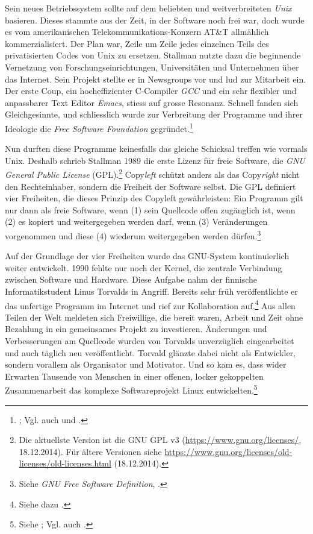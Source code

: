 \documentclass[
paper=164mm:234mm, %
pagesize, %
DIV=calc, %
10pt, %
BCOR=0mm, %
parskip=half- %
]{scrbook}
\begin{document}
Sein neues Betriebssystem sollte auf dem beliebten und weitverbreiteten \emph{Unix} basieren. Dieses stammte aus der Zeit, in der Software noch frei war, doch wurde es vom amerikanischen Telekommunikations-Konzern AT\&T allmählich kommerzialisiert. Der Plan war, Zeile um Zeile jedes einzelnen Teils des privatisierten Codes von Unix zu ersetzen. Stallman nutzte dazu die beginnende Vernetzung von Forschungseinrichtungen, Universitäten und Unternehmen über das Internet. Sein Projekt stellte er in Newsgroups vor und lud zur Mitarbeit ein. Der erste Coup, ein hocheffizienter C-Compiler \emph{GCC} und ein sehr flexibler und anpassbarer Text Editor \emph{Emacs}, stiess auf grosse Resonanz. Schnell fanden sich Gleichgesinnte, und schliesslich wurde zur Verbreitung der Programme und ihrer Ideologie die \emph{Free Software Foundation} gegründet.\footnote{\cite[7-25]{Stallman:2010}; Vgl. auch \cite[217-227]{Grassmuck:2004} und \cite[18-19]{Raymond:1999}.}

Nun durften diese Programme keinesfalls das gleiche Schicksal treffen wie vormals Unix. Deshalb schrieb Stallman 1989 die erste Lizenz für freie Software, die \emph{GNU General Public License} (GPL).\footnote{Die aktuellste Version ist die GNU GPL v3 (\url{https://www.gnu.org/licenses/}, 18.12.2014). Für ältere Versionen siehe \url{https://www.gnu.org/licenses/old-licenses/old-licenses.html} (18.12.2014).} Copy\emph{left} schützt anders als das Copy\emph{right} nicht den Rechteinhaber, sondern die Freiheit der Software selbst. Die GPL definiert vier Freiheiten, die dieses Prinzip des Copyleft gewährleisten: Ein Programm gilt nur dann als freie Software, wenn (1) sein Quellcode offen zugänglich ist, wenn (2) es kopiert und weitergegeben werden darf, wenn (3) Veränderungen vorgenommen und diese (4) wiederum weitergegeben werden dürfen.\footnote{Siehe \emph{GNU Free Software Definition}, \cite[3]{Stallman:2010}.}

Auf der Grundlage der vier Freiheiten wurde das GNU-System kontinuierlich weiter entwickelt. 1990 fehlte nur noch der Kernel, die zentrale Verbindung zwischen Software und Hardware. Diese Aufgabe nahm der finnische Informatikstudent Linus Torvalds in Angriff. Bereits sehr früh veröffentlichte er das unfertige Programm im Internet und rief zur Kollaboration auf.\footnote{Siehe dazu \cite{Torvalds:1999}.} Aus allen Teilen der Welt meldeten sich Freiwillige, die bereit waren, Arbeit und Zeit ohne Bezahlung in ein gemeinsames Projekt zu investieren. Änderungen und Verbesserungen am Quellcode wurden von Torvalds unverzüglich eingearbeitet und auch täglich neu veröffentlicht. Torvald glänzte dabei nicht als Entwickler, sondern vorallem als Organisator und Motivator. Und so kam es, dass wider Erwarten Tausende von Menschen in einer offenen, locker gekoppelten Zusammenarbeit das komplexe Softwareprojekt Linux entwickelten.\footnote{Siehe \cite{Raymond:2001}; Vgl. auch \cite[227]{Grassmuck:2004}.}
\end{document}

